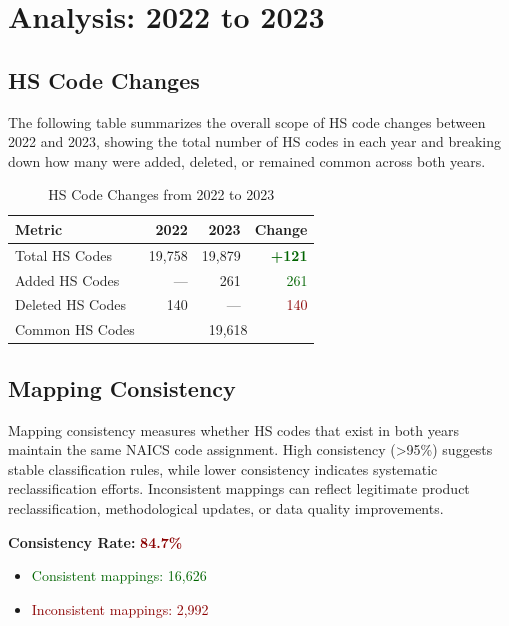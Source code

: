 \documentclass[11pt]{article}
\newcommand{\increase}[1]{\textcolor{darkgreen}{\textbf{+#1}}}
\begin{document}
\newpage


\section{Analysis: 2022 to 2023}

\subsection{HS Code Changes}

The following table summarizes the overall scope of HS code changes between 2022 and 2023, showing the total number of HS codes in each year and breaking down how many were added, deleted, or remained common across both years.

\begin{table}[H]
\centering
{}
\begin{tabular}{lrrr}
\toprule
\textbf{Metric} & \textbf{2022} & \textbf{2023} & \textbf{Change} \\
\midrule
Total HS Codes & 19,758 & 19,879 & \increase{121} \\
Added HS Codes & --- & 261 & \textcolor{darkgreen}{261} \\
Deleted HS Codes & 140 & --- & \textcolor{darkred}{140} \\
Common HS Codes & \multicolumn{3}{c}{19,618} \\
\bottomrule
\end{tabular}
\caption{HS Code Changes from 2022 to 2023}
\end{table}

\subsection{Mapping Consistency}

Mapping consistency measures whether HS codes that exist in both years maintain the same NAICS code assignment. High consistency (>95\%) suggests stable classification rules, while lower consistency indicates systematic reclassification efforts. Inconsistent mappings can reflect legitimate product reclassification, methodological updates, or data quality improvements.


\textbf{Consistency Rate:} \textcolor{darkred}{\textbf{84.7\%}}

\begin{itemize}
    \item \textcolor{darkgreen}{Consistent mappings: 16,626}
    \item \textcolor{darkred}{Inconsistent mappings: 2,992}
\end{itemize}
\end{document}
